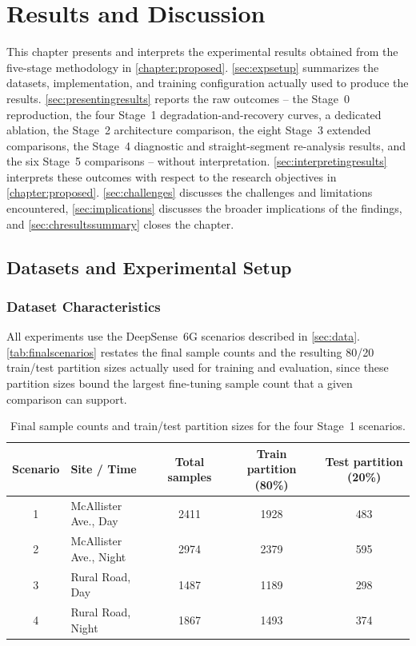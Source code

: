\documentclass{iutbscthesis}
\begin{document}
\chapter{Results and Discussion}
\label{chapter:results}

This chapter presents and interprets the experimental results obtained from the five-stage methodology in \autoref{chapter:proposed}. \autoref{sec:expsetup} summarizes the datasets, implementation, and training configuration actually used to produce the results. \autoref{sec:presentingresults} reports the raw outcomes -- the Stage~0 reproduction, the four Stage~1 degradation-and-recovery curves, a dedicated ablation, the Stage~2 architecture comparison, the eight Stage~3 extended comparisons, the Stage~4 diagnostic and straight-segment re-analysis results, and the six Stage~5 comparisons -- without interpretation. \autoref{sec:interpretingresults} interprets these outcomes with respect to the research objectives in \autoref{chapter:proposed}. \autoref{sec:challenges} discusses the challenges and limitations encountered, \autoref{sec:implications} discusses the broader implications of the findings, and \autoref{sec:chresultssummary} closes the chapter.

\section{Datasets and Experimental Setup}
\label{sec:expsetup}

\subsection{Dataset Characteristics}

All experiments use the DeepSense~6G scenarios described in \autoref{sec:data}. \autoref{tab:finalscenarios} restates the final sample counts and the resulting 80/20 train/test partition sizes actually used for training and evaluation, since these partition sizes bound the largest fine-tuning sample count that a given comparison can support.

\begin{table}[H]
    \centering
    \begin{tabular}{c l c c c}
        \toprule
        Scenario & Site / Time & Total samples & Train partition (80\%) & Test partition (20\%) \\
        \midrule
        1 & McAllister Ave., Day & 2411 & 1928 & 483 \\
        2 & McAllister Ave., Night & 2974 & 2379 & 595 \\
        3 & Rural Road, Day & 1487 & 1189 & 298 \\
        4 & Rural Road, Night & 1867 & 1493 & 374 \\
        \bottomrule
    \end{tabular}
    \caption{Final sample counts and train/test partition sizes for the four Stage~1 scenarios.}
    \label{tab:finalscenarios}
\end{table}
\end{document}
